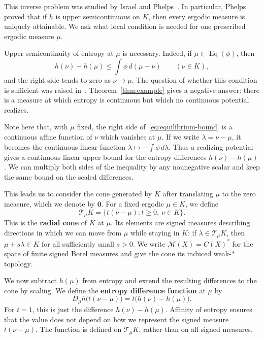 \documentclass[10pt]{amsart}
\numberwithin{equation}{section}
\newcommand{\Eq}{\operatorname{Eq}}
\newcommand{\CM}{\mathcal M}
\newcommand{\CT}{\mathcal T}
\newcommand{\zeromeasure}{\mathbf{0}}
\begin{document}
This inverse problem was studied by Israel and
Phelps~\cite{israel-phelps}. In particular,
Phelps~\cite[Theorem~1]{phelps} proved that if $h$ is upper
semicontinuous on $K$, then every ergodic measure is uniquely
attainable. We ask what local condition is needed for one prescribed
ergodic measure $\mu$.

Upper semicontinuity of entropy at $\mu$ is necessary. Indeed, if
$\mu\in\Eq(\phi)$, then
\begin{equation}\label{eq:equilibrium-bound}
 h(\nu)-h(\mu)\leq\int\phi\,d(\mu-\nu)
 \qquad(\nu\in K),
\end{equation}
and the right side tends to zero as $\nu\to\mu$. The question of
whether this condition is sufficient was raised
in~\cite[Section~1.1]{hedges-freezing}. Theorem~\ref{thm:example}
gives a negative answer: there is a measure at which
entropy is continuous but which no continuous potential realizes.

Note here that, with $\mu$ fixed, the right side
of~\eqref{eq:equilibrium-bound} is a continuous affine function of
$\nu$ which vanishes at $\mu$. If we write $\lambda=\nu-\mu$, it
becomes the continuous linear function
$\lambda\mapsto-\int\phi\,d\lambda$. Thus a realizing potential
gives a continuous linear upper bound for the entropy differences
$h(\nu)-h(\mu)$. We can multiply both sides of the inequality by any
nonnegative scalar and keep the same bound on the scaled differences.

This leads us to consider the cone generated by $K$ after translating
$\mu$ to the zero measure, which we denote by $\zeromeasure$. For a
fixed ergodic $\mu\in K$, we define
\begin{equation}\label{eq:radial-cone}
 \CT_\mu K=\{t(\nu-\mu):t\geq0,\ \nu\in K\}.
\end{equation}
This is the \textbf{radial cone} of $K$ at $\mu$. Its elements are
signed measures describing directions in which we can move from $\mu$
while staying in $K$: if $\lambda\in\CT_\mu K$, then
$\mu+s\lambda\in K$ for all sufficiently small $s>0$. We write
$\CM(X)=C(X)^*$ for the space of finite signed Borel measures and
give the cone its induced weak\nobreakdash-$*$ topology.

We now subtract $h(\mu)$ from entropy and extend the resulting
differences to the cone by scaling. We define the
\textbf{entropy difference function} at $\mu$ by
\begin{equation}\label{eq:entropy-difference}
 D_\mu h\bigl(t(\nu-\mu)\bigr)
 =t\bigl(h(\nu)-h(\mu)\bigr).
\end{equation}
For $t=1$, this is just the difference $h(\nu)-h(\mu)$. Affinity of
entropy ensures that the value does not depend on how we represent
the signed measure $t(\nu-\mu)$. The function is defined on
$\CT_\mu K$, rather than on all signed measures.
\end{document}
